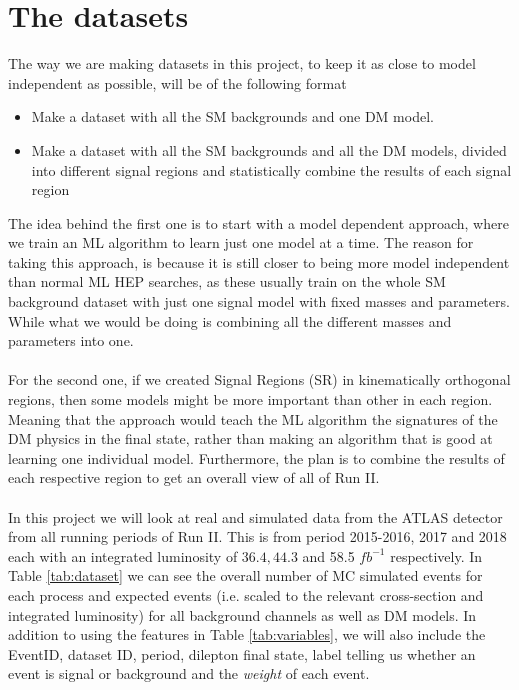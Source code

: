 \documentclass[12pt, a4paper]{book}
\begin{document}
\section{The datasets}
The way we are making datasets in this project, to keep it as close to model independent as possible, will be of the following format
\begin{itemize}
   \item Make a dataset with all the SM backgrounds and one DM model.
   \item Make a dataset with all the SM backgrounds and all the DM models, divided into different signal regions and statistically combine the results of each signal region
\end{itemize}
The idea behind the first one is to start with a model dependent approach, where we train an ML algorithm to learn just one model at a time. The reason for taking this approach, is because it is still closer to being more model independent than normal ML HEP searches, as these usually train on the whole SM background dataset with just one 
signal model with fixed masses and parameters. While what we would be doing is combining all the different masses and parameters into one.\\
\\For the second one, if we created Signal Regions (SR) in kinematically orthogonal regions, then some models might be more important than other in each region. Meaning that the approach would teach the ML algorithm the signatures of the DM physics in the final state, rather than making an algorithm that is good at learning one individual model.
Furthermore, the plan is to combine the results of each respective region to get an overall view of all of Run II.\\
\\In this project we will look at real and simulated data from the ATLAS detector from all running periods of Run II. This is from period 2015-2016, 2017 and 2018 each with an integrated luminosity of $36.4, 44.3$ and 58.5 $fb^{-1}$ respectively. 
In Table \ref{tab:dataset} we can see the overall number of MC simulated events for each process and expected events (i.e. scaled to the relevant cross-section and integrated luminosity) for all background channels as well as DM models. In addition to using the features in Table \ref{tab:variables}, we will also include the EventID, dataset ID, period, 
dilepton final state, label telling us whether an event is signal or background and the \textit{weight} of each event.
\end{document}
